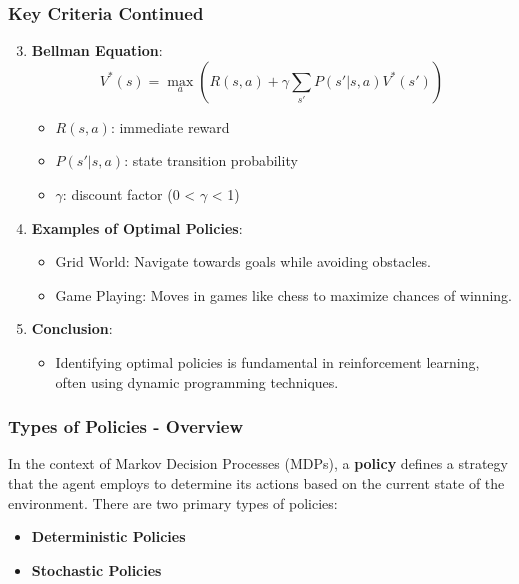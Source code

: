 \documentclass[aspectratio=169]{beamer}
\begin{document}
\begin{frame}[fragile]
    \frametitle{Key Criteria Continued}
    \begin{enumerate}
        \setcounter{enumi}{2}
        \item \textbf{Bellman Equation}:
            \begin{equation}
            V^*(s) = \max_{a} \left( R(s, a) + \gamma \sum_{s'} P(s'|s, a)V^*(s') \right)
            \end{equation}
            \begin{itemize}
                \item $R(s, a)$: immediate reward
                \item $P(s'|s, a)$: state transition probability
                \item $\gamma$: discount factor (0 < $\gamma$ < 1)
            \end{itemize}
        \item \textbf{Examples of Optimal Policies}:
            \begin{itemize}
                \item Grid World: Navigate towards goals while avoiding obstacles.
                \item Game Playing: Moves in games like chess to maximize chances of winning.
            \end{itemize}
        \item \textbf{Conclusion}:
            \begin{itemize}
                \item Identifying optimal policies is fundamental in reinforcement learning, often using dynamic programming techniques.
            \end{itemize}
    \end{enumerate}
\end{frame}

\begin{frame}[fragile]
    \frametitle{Types of Policies - Overview}
    In the context of Markov Decision Processes (MDPs), a \textbf{policy} defines a strategy that the agent employs to determine its actions based on the current state of the environment. There are two primary types of policies: 
    \begin{itemize}
        \item \textbf{Deterministic Policies}
        \item \textbf{Stochastic Policies}
    \end{itemize}
\end{frame}
\end{document}
